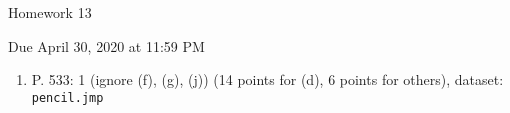 \documentclass{article}
\begin{document}
\begin{center} \LARGE
Homework 13
\end{center}
\begin{center} \Large
Due April 30, 2020 at 11:59 PM 
\end{center}



\begin{enumerate}
	\item P. 533: 1 (ignore (f), (g), (j)) (14 points for (d), 6 points for others), dataset: {\tt pencil.jmp} 
	
	
\end{enumerate}
% 
%
\end{document}
